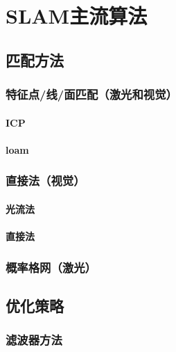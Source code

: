 \documentclass{ctexart}
\begin{document}
{	
	\section{SLAM主流算法}
	\subsection{匹配方法}
	\subsubsection{特征点/线/面匹配（激光和视觉）}
	\paragraph{ICP}
	\paragraph{loam}
	\subsubsection{直接法（视觉）}
	\paragraph{光流法}
	\paragraph{直接法}
	\subsubsection{概率格网（激光）}
	\subsection{优化策略}
	\subsubsection{滤波器方法}
}
\end{document}
